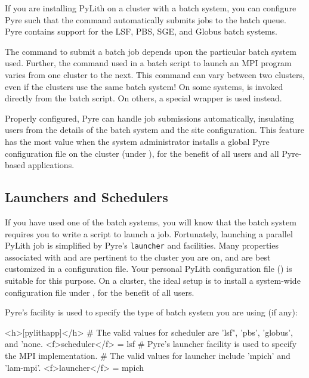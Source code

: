 If you are installing PyLith on a cluster with a batch system, you can
configure Pyre such that the  command automatically
submits jobs to the batch queue. Pyre contains support for the LSF,
PBS, SGE, and Globus batch systems.

The command to submit a batch job depends upon the particular batch
system used. Further, the command used in a batch script to launch an
MPI program varies from one cluster to the next. This command can vary
between two clusters, even if the clusters use the same batch system!
On some systems,  is invoked directly from the batch
script. On others, a special wrapper is used instead.

Properly configured, Pyre can handle job submissions automatically,
insulating users from the details of the batch system and the site
configuration. This feature has the most value when the system
administrator installs a global Pyre configuration file on the cluster
(under ), for the benefit of all users and
all Pyre-based applications.


\subsection{Launchers and Schedulers}
\label{sec:launchers:schedulers}

If you have used one of the batch systems, you will know that the
batch system requires you to write a script to launch a
job. Fortunately, launching a parallel PyLith job is simplified by
Pyre's \texttt{launcher} and  facilities. Many
properties associated with  and 
are pertinent to the cluster you are on, and are best customized in a
configuration file. Your personal PyLith configuration file
() is suitable
for this purpose. On a cluster, the ideal setup is to install a
system-wide configuration file under , for the
benefit of all users.

Pyre's  facility is used to specify the type of
batch system you are using (if any):
\begin{cfg}
<h>[pylithapp]</h>
# The valid values for scheduler are 'lsf", 'pbs', 'globus', and 'none.
<f>scheduler</f> = lsf
# Pyre's launcher facility is used to specify the MPI implementation.
# The valid values for launcher include 'mpich' and 'lam-mpi'.
<f>launcher</f> = mpich
\end{cfg}

